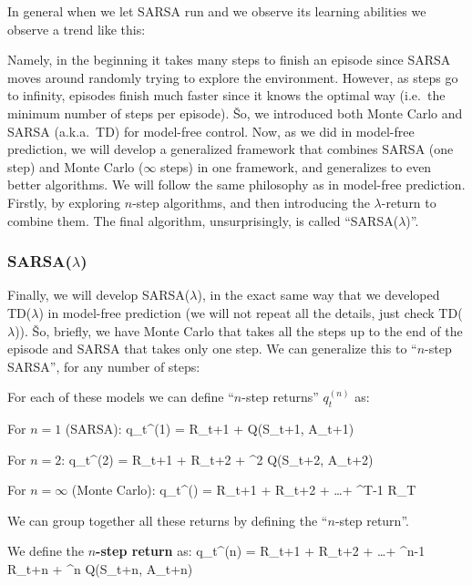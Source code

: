 In general when we let SARSA run and we observe its learning abilities we observe a trend like this:


Namely, in the beginning it takes many steps to finish an episode since SARSA moves around randomly trying to
explore the environment. However, as steps go to infinity, episodes finish much faster since it knows the optimal
way (i.e.\ the minimum number of steps per episode). \v

So, we introduced both Monte Carlo and SARSA (a.k.a.\ TD) for model-free control. Now, as we did in model-free
prediction, we will develop a generalized framework that combines SARSA (one step) and Monte Carlo ($\infty$ steps)
in one framework, and generalizes to even better algorithms. We will follow the same philosophy as in model-free
prediction. Firstly, by exploring $n$-step algorithms, and then introducing the $\lambda$-return to combine them.
The final algorithm, unsurprisingly, is called ``SARSA($\lambda$)''.

\subsubsection{SARSA($\lambda$)}

Finally, we will develop SARSA($\lambda$), in the exact same way that we developed TD($\lambda$) in model-free
prediction (we will not repeat all the details, just check TD($\lambda$)). \v

So, briefly, we have Monte Carlo that takes all the steps up to the end of the episode and SARSA that takes only one
step. We can generalize this to ``$n$-step SARSA'', for any number of steps:


For each of these models we can define ``$n$-step returns'' $q_t^{(n)}$ as:
\bit
\item For $n=1$ (SARSA):
\bse
q_t^{(1)} = R_{t+1} + \gamma Q(S_{t+1}, A_{t+1})
\ese

\item For $n=2$:
\bse
q_t^{(2)} = R_{t+1} + \gamma R_{t+2} + \gamma^2 Q(S_{t+2}, A_{t+2})
\ese

\item For $n=\infty$ (Monte Carlo):
\bse
q_t^{(\infty)} = R_{t+1} + \gamma R_{t+2} + \ldots + \gamma^{T-1} R_T
\ese
\eit

We can group together all these returns by defining the ``$n$-step return''.

We define the \textbf{$n$-step return} as:
\bse
q_t^{(n)} = R_{t+1} + \gamma R_{t+2} + \ldots + \gamma^{n-1} R_{t+n} + \gamma^{n} Q(S_{t+n}, A_{t+n})
\ese
\ed

